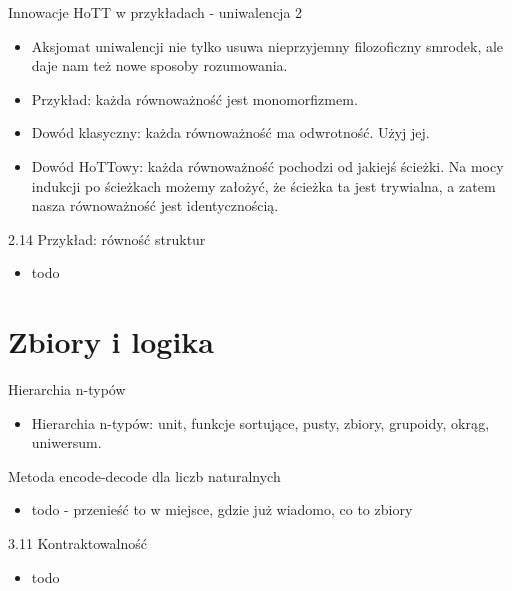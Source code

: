\documentclass{beamer}
\begin{document}
\begin{frame}{Innowacje HoTT w przykładach - uniwalencja 2}
\begin{itemize}
	\item Aksjomat uniwalencji nie tylko usuwa nieprzyjemny filozoficzny smrodek, ale daje nam też nowe sposoby rozumowania.
	\item Przykład: każda równoważność jest monomorfizmem.
	\item Dowód klasyczny: każda równoważność ma odwrotność. Użyj jej.
	\item Dowód HoTTowy: każda równoważność pochodzi od jakiejś ścieżki. Na mocy indukcji po ścieżkach możemy założyć, że ścieżka ta jest trywialna, a zatem nasza równoważność jest identycznością.
\end{itemize}
\end{frame}

\begin{frame}{2.14 Przykład: równość struktur}
\begin{itemize}
	\item todo
\end{itemize}
\end{frame}

\section{Zbiory i logika}

\begin{frame}{Hierarchia n-typów}
\begin{itemize}
	\item Hierarchia n-typów: unit, funkcje sortujące, pusty, zbiory, grupoidy, okrąg, uniwersum.
	
\end{itemize}
\end{frame}

\begin{frame}{Metoda encode-decode dla liczb naturalnych}
\begin{itemize}
	\item todo - przenieść to w miejsce, gdzie już wiadomo, co to zbiory
\end{itemize}
\end{frame}

\begin{frame}{3.11 Kontraktowalność}
\begin{itemize}
	\item todo
\end{itemize}
\end{frame}
\end{document}
